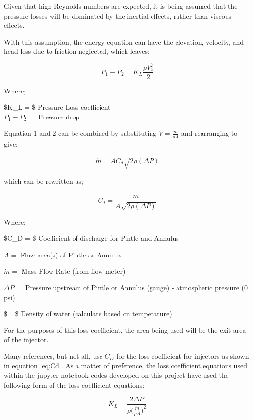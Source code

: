 \documentclass[11pt]{article}
\begin{document}
Given that high Reynolds numbers are expected, it is being assumed that
the pressure losses will be dominated by the inertial effects, rather
than viscous effects.

With this assumption, the energy equation can have the elevation,
velocity, and head loss due to friction neglected, which leaves:

\begin{equation}
P_1-P_2 = K_{L}\frac{\rho V_2^2}{2}
\label{eq:energy}
\tag{2}
\end{equation}

Where;

\$K\_L = \$ Pressure Loss coefficient\\
\(P_1-P_2 =\) Pressure drop

Equation 1 and 2 can be combined by substituting
\(V = \frac{\dot{m}}{\rho A}\) and rearranging to give;

\begin{equation}
\dot{m} = AC_d \sqrt{2\rho(\Delta P)}
\label{eq:massflow+cd}
\tag{3}
\end{equation}

which can be rewritten as;

\begin{equation}
C_d = \frac{\dot{m}}{A \sqrt{2\rho(\Delta P)}}
\label{eq:Cd}
\tag{4}
\end{equation}

Where;

\$C\_D = \$ Coefficient of discharge for Pintle and Annulus

\(A =\) Flow area(s) of Pintle or Annulus

\(\dot{m} =\) Mass Flow Rate (from flow meter)

\(\Delta P =\) Pressure upstream of Pintle or Annulus (gauge) -
atmospheric pressure (0 psi)

\$\rho = \$ Density of water (calculate based on temperature)

For the purposes of this loss coefficient, the area being used will be
the exit area of the injector.

Many references, but not all, use \(C_D\) for the loss coefficient for
injectors as shown in equation \ref{eq:Cd}. As a matter of preference,
the loss coefficient equations used within the jupyter notebook codes
developed on this project have used the following form of the loss
coefficient equations:

\begin{equation}
K_L = \frac{2\Delta P}{\rho \big(\frac{\dot{m}}{\rho A}\big)^2}
\label{eq:Kl}
\tag{7}
\end{equation}
\end{document}
